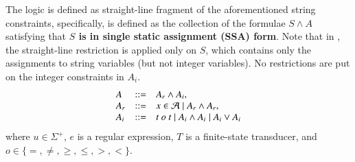 {The logic {\slint} is defined as straight-line fragment of the aforementioned string constraints, specifically, {\slint} is defined as the collection of the formulae $S \wedge A$ satisfying that {\bf $S$ is in single static assignment (SSA) form}.  Note that in {\slint}, the straight-line restriction is applied only on $S$, which contains only the assignments to string variables (but not integer variables). No restrictions are put on the integer constraints in $A_i$.
\[
\begin{array}{l c l}
A & ::= &   A_r \wedge A_i, \\
A_r & ::= & x \in \mathcal{A} \mid A_r \wedge A_r,\\
A_i & ::= & t\ o\ t \mid A_i \wedge A_i  \mid A_i \vee A_i
\end{array}
\]
where  $u \in \Sigma^+$, $e$ is a regular expression, $T$ is a finite-state transducer, and $o \in \{=, \neq, \ge, \le, >, <\}$.


%

}
